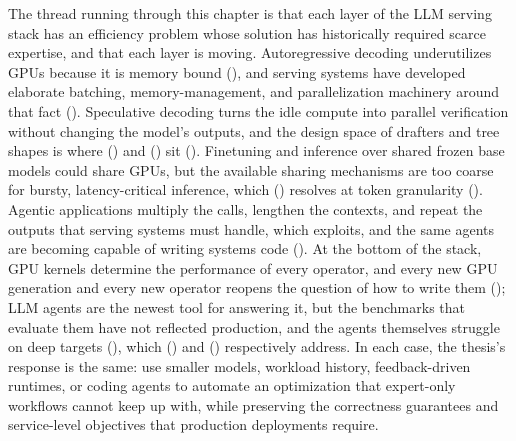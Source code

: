 The thread running through this chapter is that each layer of the LLM serving stack has an efficiency problem whose solution has historically required scarce expertise, and that each layer is moving.
Autoregressive decoding underutilizes GPUs because it is memory bound (), and serving systems have developed elaborate batching, memory-management, and parallelization machinery around that fact ().
Speculative decoding turns the idle compute into parallel verification without changing the model's outputs, and the design space of drafters and tree shapes is where \SpecInfer () and \SuffixDecoding () sit ().
Finetuning and inference over shared frozen base models could share GPUs, but the available sharing mechanisms are too coarse for bursty, latency-critical inference, which \FlexLLM () resolves at token granularity ().
Agentic applications multiply the calls, lengthen the contexts, and repeat the outputs that serving systems must handle, which \SuffixDecoding exploits, and the same agents are becoming capable of writing systems code ().
At the bottom of the stack, GPU kernels determine the performance of every operator, and every new GPU generation and every new operator reopens the question of how to write them (); LLM agents are the newest tool for answering it, but the benchmarks that evaluate them have not reflected production, and the agents themselves struggle on deep targets (), which \FastKernels () and \KernelSeek () respectively address.
In each case, the thesis's response is the same: use smaller models, workload history, feedback-driven runtimes, or coding agents to automate an optimization that expert-only workflows cannot keep up with, while preserving the correctness guarantees and service-level objectives that production deployments require.
